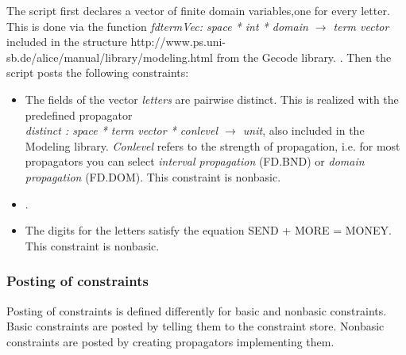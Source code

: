 \documentclass[a4paper,halfparskip]{scrartcl}
\begin{document}
The script first declares a vector of finite domain variables,one for every letter. 
This is done via
the function \emph{fdtermVec: space * int * domain $ \rightarrow $ term vector}
included in the structure
\htmladdnormallink{\textcolor{blue}{Modeling}}
{http://www.ps.uni-sb.de/alice/manual/library/modeling.html} from the Gecode 
library. . 
Then the script posts the
following constraints:
\begin{itemize}
\item
The fields of the vector \emph{letters} are pairwise 
distinct. This is
realized with the predefined propagator \\
\emph{distinct : space * term vector * conlevel $ \rightarrow $ 
unit}, also included
in the Modeling library. \emph{Conlevel} refers to 
the strength of
propagation, i.e. for most propagators you can select 
\emph{interval propagation} (FD.BND)
or \emph{domain propagation} (FD.DOM). 
This constraint 
is nonbasic.
\item
{}.
\item
The digits for the letters satisfy the equation
SEND + MORE = MONEY. This constraint is nonbasic.
\end{itemize}

\subsubsection{Posting of constraints}
Posting of constraints is defined differently for basic and 
nonbasic constraints. Basic constraints are posted by telling 
them to the constraint store. Nonbasic constraints are posted 
by creating propagators implementing them.
\end{document}
